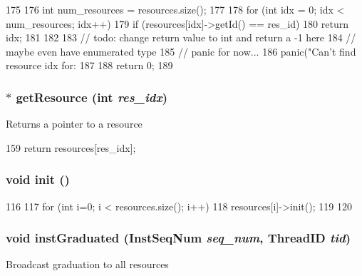 \begin{DoxyCode}
175 {
176     int num_resources = resources.size();
177 
178     for (int idx = 0; idx < num_resources; idx++) {
179         if (resources[idx]->getId() == res_id)
180             return idx;
181     }
182 
183     // todo: change return value to int and return a -1 here
184     //       maybe even have enumerated type
185     //       panic for now...
186     panic("Can't find resource idx for: %
187 
188     return 0;
189 }
\end{DoxyCode}
\hypertarget{classResourcePool_a70b29b3de5f1fcf1d1a666dd5303250a}{
\subsubsection[{getResource}]{$\ast$ getResource (int {\em res\_\-idx})}}
\label{classResourcePool_a70b29b3de5f1fcf1d1a666dd5303250a}
Returns a pointer to a resource 


\begin{DoxyCode}
159 { return resources[res_idx]; }
\end{DoxyCode}
\hypertarget{classResourcePool_a02fd73d861ef2e4aabb38c0c9ff82947}{
\subsubsection[{init}]{\setlength{\rightskip}{0pt plus 5cm}void init ()}}
\label{classResourcePool_a02fd73d861ef2e4aabb38c0c9ff82947}



\begin{DoxyCode}
116 {
117     for (int i=0; i < resources.size(); i++) {
118         resources[i]->init();
119     }
120 }
\end{DoxyCode}
\hypertarget{classResourcePool_a3f5f4da90448a4c3a3c0533881fb3129}{
\subsubsection[{instGraduated}]{\setlength{\rightskip}{0pt plus 5cm}void instGraduated ({\bf InstSeqNum} {\em seq\_\-num}, \/  {\bf ThreadID} {\em tid})}}
\label{classResourcePool_a3f5f4da90448a4c3a3c0533881fb3129}
Broadcast graduation to all resources 


